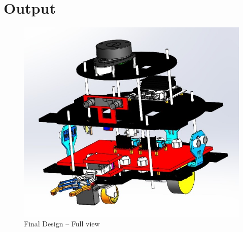 \newpage

\section{Output} %

\begin{figure}[h!]
	\centering
	\includegraphics[scale=0.23]{./Figures/Mech/full.jpeg}
	\caption{Final Design -- Full view}
	\label{fig:mech1}
\end{figure}

